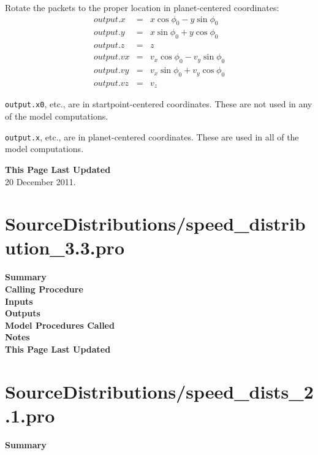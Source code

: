 \documentclass[11pt]{article}
\newcommand\descrip[1]{\textsf{\textbf{\large{#1}}}\\}
\begin{document}
\begin{compactenum}
\begin{compactenum}
  \item Rotate the packets to the proper location in planet-centered
  coordinates:
    \begin{eqnarray}
    output.x & = & x \cos \phi_0 - y \sin \phi_0 \\
    output.y & = & x \sin \phi_0 + y \cos \phi_0 \\
    output.z & = & z \\ 
    output.vx & = & v_x \cos \phi_0 - v_y \sin \phi_0 \\
    output.vy & = & v_x \sin \phi_0 + v_y \cos \phi_0 \\
    output.vz & = & v_z 
    \end{eqnarray}
  \end{compactenum}
  
\item \texttt{output.x0}, etc., are in startpoint-centered coordinates. These
are not used in any of the model computations.
\item \texttt{output.x}, etc., are in planet-centered coordinates. These are
used in all of the model computations.
\end{compactenum}


\descrip{This Page Last Updated}
20 December 2011.

\clearpage

\section{SourceDistributions/speed\_distribution\_3.3.pro}
\label{sec:speed_distribution}

\descrip{Summary}

\descrip{Calling Procedure}

\descrip{Inputs}

\descrip{Outputs}

\descrip{Model Procedures Called}

\descrip{Notes}

\descrip{This Page Last Updated}

\clearpage

\section{SourceDistributions/speed\_dists\_2.1.pro} \label{sec:speed_dists}

\descrip{Summary}
\end{document}
